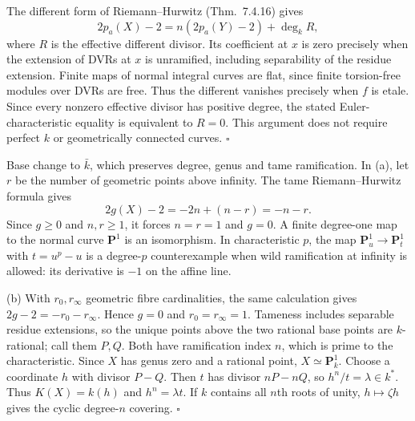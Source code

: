 \documentclass[11pt]{article}
\let\chapterexercise\exercise
\renewcommand{\exercise}[2]{\Needspace{8\baselineskip}\chapterexercise{#1}{#2}}
\begin{document}
\pf
The different form of Riemann--Hurwitz (Thm.~7.4.16) gives
\[ 2p_a(X)-2=n(2p_a(Y)-2)+\deg_k R, \]
where $R$ is the effective different divisor. Its coefficient at $x$ is zero precisely when the extension of DVRs at $x$ is unramified, including separability of the residue extension. Finite maps of normal integral curves are flat, since finite torsion-free modules over DVRs are free. Thus the different vanishes precisely when $f$ is etale. Since every nonzero effective divisor has positive degree, the stated Euler-characteristic equality is equivalent to $R=0$. This argument does not require perfect $k$ or geometrically connected curves. \hfill$\square$

\pf
Base change to $\bar k$, which preserves degree, genus and tame ramification. In (a), let $r$ be the number of geometric points above infinity. The tame Riemann--Hurwitz formula gives
\[ 2g(X)-2=-2n+(n-r)=-n-r. \]
Since $g\ge0$ and $n,r\ge1$, it forces $n=r=1$ and $g=0$. A finite degree-one map to the normal curve $\mathbf P^1$ is an isomorphism. In characteristic $p$, the map $\mathbf P^1_u\to\mathbf P^1_t$ with $t=u^p-u$ is a degree-$p$ counterexample when wild ramification at infinity is allowed: its derivative is $-1$ on the affine line.

(b) With $r_0,r_\infty$ geometric fibre cardinalities, the same calculation gives $2g-2=-r_0-r_\infty$. Hence $g=0$ and $r_0=r_\infty=1$. Tameness includes separable residue extensions, so the unique points above the two rational base points are $k$-rational; call them $P,Q$. Both have ramification index $n$, which is prime to the characteristic. Since $X$ has genus zero and a rational point, $X\simeq\mathbf P^1_k$. Choose a coordinate $h$ with divisor $P-Q$. Then $t$ has divisor $nP-nQ$, so $h^n/t=\lambda\in k^*$. Thus $K(X)=k(h)$ and $h^n=\lambda t$. If $k$ contains all $n$th roots of unity, $h\mapsto\zeta h$ gives the cyclic degree-$n$ covering. \hfill$\square$
\end{document}
